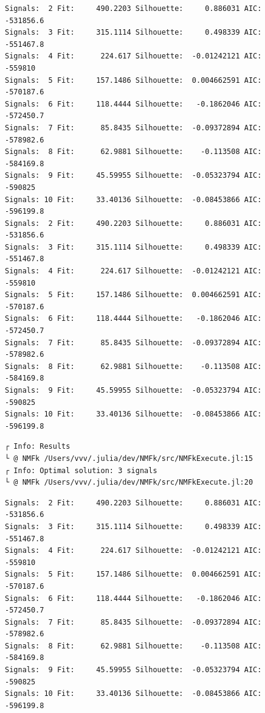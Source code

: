 \documentclass[11pt]{article}
\begin{document}
    \begin{Verbatim}[commandchars=\\\{\}]
Signals:  2 Fit:     490.2203 Silhouette:     0.886031 AIC:    -531856.6
Signals:  3 Fit:     315.1114 Silhouette:     0.498339 AIC:    -551467.8
Signals:  4 Fit:      224.617 Silhouette:  -0.01242121 AIC:      -559810
Signals:  5 Fit:     157.1486 Silhouette:  0.004662591 AIC:    -570187.6
Signals:  6 Fit:     118.4444 Silhouette:   -0.1862046 AIC:    -572450.7
Signals:  7 Fit:      85.8435 Silhouette:  -0.09372894 AIC:    -578982.6
Signals:  8 Fit:      62.9881 Silhouette:    -0.113508 AIC:    -584169.8
Signals:  9 Fit:     45.59955 Silhouette:  -0.05323794 AIC:      -590825
Signals: 10 Fit:     33.40136 Silhouette:  -0.08453866 AIC:    -596199.8
Signals:  2 Fit:     490.2203 Silhouette:     0.886031 AIC:    -531856.6
Signals:  3 Fit:     315.1114 Silhouette:     0.498339 AIC:    -551467.8
Signals:  4 Fit:      224.617 Silhouette:  -0.01242121 AIC:      -559810
Signals:  5 Fit:     157.1486 Silhouette:  0.004662591 AIC:    -570187.6
Signals:  6 Fit:     118.4444 Silhouette:   -0.1862046 AIC:    -572450.7
Signals:  7 Fit:      85.8435 Silhouette:  -0.09372894 AIC:    -578982.6
Signals:  8 Fit:      62.9881 Silhouette:    -0.113508 AIC:    -584169.8
Signals:  9 Fit:     45.59955 Silhouette:  -0.05323794 AIC:      -590825
Signals: 10 Fit:     33.40136 Silhouette:  -0.08453866 AIC:    -596199.8
    \end{Verbatim}

    \begin{Verbatim}[commandchars=\\\{\}]
┌ Info: Results
└ @ NMFk /Users/vvv/.julia/dev/NMFk/src/NMFkExecute.jl:15
┌ Info: Optimal solution: 3 signals
└ @ NMFk /Users/vvv/.julia/dev/NMFk/src/NMFkExecute.jl:20
    \end{Verbatim}

    \begin{Verbatim}[commandchars=\\\{\}]
Signals:  2 Fit:     490.2203 Silhouette:     0.886031 AIC:    -531856.6
Signals:  3 Fit:     315.1114 Silhouette:     0.498339 AIC:    -551467.8
Signals:  4 Fit:      224.617 Silhouette:  -0.01242121 AIC:      -559810
Signals:  5 Fit:     157.1486 Silhouette:  0.004662591 AIC:    -570187.6
Signals:  6 Fit:     118.4444 Silhouette:   -0.1862046 AIC:    -572450.7
Signals:  7 Fit:      85.8435 Silhouette:  -0.09372894 AIC:    -578982.6
Signals:  8 Fit:      62.9881 Silhouette:    -0.113508 AIC:    -584169.8
Signals:  9 Fit:     45.59955 Silhouette:  -0.05323794 AIC:      -590825
Signals: 10 Fit:     33.40136 Silhouette:  -0.08453866 AIC:    -596199.8
    \end{Verbatim}
\end{document}
